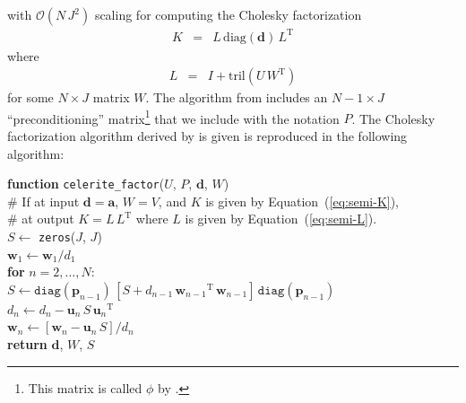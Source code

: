 \documentclass[rnaas]{aastex62}
\renewcommand{\eqref}[1]{\ref{eq:#1}}
\newcommand{\Eq}[1]{Equation~(\eqref{#1})}
\newcommand{\eqlabel}[1]{\label{eq:#1}}
\newcommand{\T}{\ensuremath{\mathrm{T}}}
\newcommand{\bvec}[1]{{\ensuremath{\boldsymbol{#1}}}}
\begin{document}
with $\mathcal{O}(N\,J^2)$ scaling for computing the Cholesky factorization
\begin{eqnarray}
K &=& L\,\mathrm{diag}(\bvec{d})\,L^\T
\end{eqnarray}
where
\begin{eqnarray}\eqlabel{semi-L}
L &=& I + \mathrm{tril}(U\,W^\T)
\end{eqnarray}
for some $N \times J$ matrix $W$.
The algorithm from \citet{Foreman-Mackey:2017} includes an $N-1 \times J$
``preconditioning'' matrix\footnote{This matrix is called $\phi$ by
\citet{Foreman-Mackey:2017}.} that we include with the notation $P$.
The Cholesky factorization algorithm derived by \citet{Foreman-Mackey:2017} is
given is reproduced in the following algorithm:

\medskip
\begin{minipage}{\linewidth}
\textbf{function} \texttt{celerite\_factor}($U$, $P$, $\bvec{d}$, $W$) \\
\hspace*{2em}\textsf{\# If at input $\bvec{d} = \bvec{a}$, $W = V$, and $K$ is
    given by \Eq{semi-K},} \\
\hspace*{2em}\textsf{\# at output $K = L\,L^\T$ where $L$ is given by
    \Eq{semi-L}.} \\
\hspace*{2em}$S \gets$ \texttt{zeros}($J$, $J$) \\
    \hspace*{2em}$\bvec{w}_1 \gets \bvec{w}_1 / d_{1}$ \\
\hspace*{2em}\textbf{for} $n = 2,\ldots,N$:\\
\hspace*{2em}\hspace*{2em}$S \gets \texttt{diag}(\bvec{p}_{n-1})\,[
    S + d_{n-1}\,{\bvec{w}_{n-1}}^\T\,{\bvec{w}_{n-1}}
]\,\texttt{diag}(\bvec{p}_{n-1})$ \\
\hspace*{2em}\hspace*{2em}$d_{n} \gets d_{n} - \bvec{u}_n\,S\,{\bvec{u}_n}^\T$\\
\hspace*{2em}\hspace*{2em}$\bvec{w}_n \gets \left[\bvec{w}_n -
    \bvec{u}_n\,S \right] / d_{n}$\\
    \hspace*{2em}\textbf{return} $\bvec{d}$, $W$, $S$
\end{minipage}
\medskip
\end{document}
